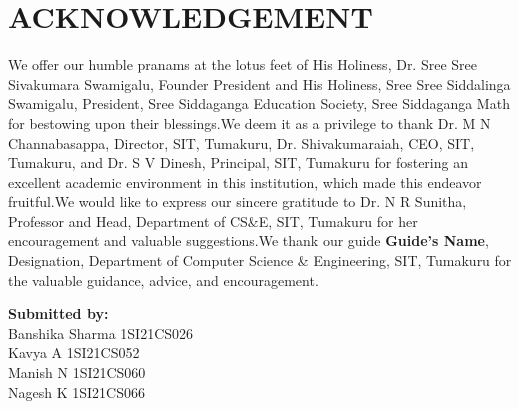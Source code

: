 \documentclass[a4paper,12pt]{report}
\begin{document}
\chapter*{ACKNOWLEDGEMENT}

We offer our humble pranams at the lotus feet of His Holiness, Dr. Sree Sree Sivakumara Swamigalu, Founder President and His Holiness, Sree Sree Siddalinga Swamigalu, President, Sree Siddaganga Education Society, Sree Siddaganga Math for bestowing upon their blessings.We deem it as a privilege to thank Dr. M N Channabasappa, Director, SIT, Tumakuru, Dr. Shivakumaraiah, CEO, SIT, Tumakuru, and Dr. S V Dinesh, Principal, SIT, Tumakuru for fostering an excellent academic environment in this institution, which made this endeavor fruitful.We would like to express our sincere gratitude to Dr. N R Sunitha, Professor and Head, Department of CS&E, SIT, Tumakuru for her encouragement and valuable suggestions.We thank our guide \textbf{Guide’s Name}, Designation, Department of Computer Science \& Engineering, SIT, Tumakuru for the valuable guidance, advice, and encouragement.





\begin{flushright}
    \textbf{Submitted by:} \\[0.3cm]
    Banshika Sharma      1SI21CS026 \\[0.3cm]
    Kavya A              1SI21CS052 \\[0.3cm]
    Manish N             1SI21CS060 \\[0.3cm]
    Nagesh K             1SI21CS066
\end{flushright}
\end{document}
